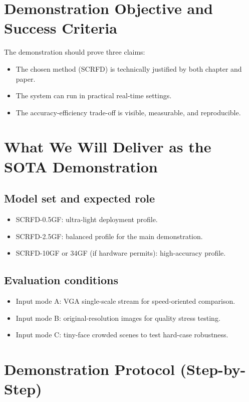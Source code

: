 ﻿%

\section{Demonstration Objective and Success Criteria}

The demonstration should prove three claims:
\begin{itemize}
  \item The chosen method (SCRFD) is technically justified by both chapter and paper.
  \item The system can run in practical real-time settings.
  \item The accuracy-efficiency trade-off is visible, measurable, and reproducible.
\end{itemize}

\section{What We Will Deliver as the SOTA Demonstration}

\subsection{Model set and expected role}
\begin{itemize}
  \item SCRFD-0.5GF: ultra-light deployment profile.
  \item SCRFD-2.5GF: balanced profile for the main demonstration.
  \item SCRFD-10GF or 34GF (if hardware permits): high-accuracy profile.
\end{itemize}

\subsection{Evaluation conditions}
\begin{itemize}
  \item Input mode A: VGA single-scale stream for speed-oriented comparison.
  \item Input mode B: original-resolution images for quality stress testing.
  \item Input mode C: tiny-face crowded scenes to test hard-case robustness.
\end{itemize}

\section{Demonstration Protocol (Step-by-Step)}

